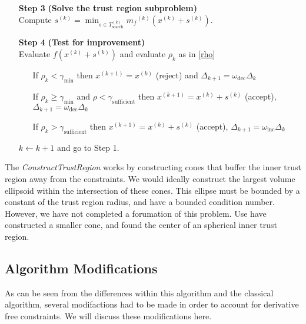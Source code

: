 \documentclass{article}
\theoremstyle{case}
\newcommand{\modelk}{{{m}_f}^{(k)}}
\newcommand{\iteratek}{{x}^{(k)}}
\newcommand{\trialk}{{{s}^{(k)}}}
\newcommand{\iteratekpone}{{x}^{(k+1)}}
\newcommand{\outertrk}{{T_{\text{out}}^{(k)}}}
\newcommand{\searchtrk}{{T_{\text{search}}^{(k)}}}
\newcommand{\feasiblek}{{F}^{(k)}}
\newcommand{\omegainc}{\omega_{\text{inc}}}
\newcommand{\omegadec}{\omega_{\text{dec}}}
\newcommand{\gammasm}{\gamma_{\text{min}}}
\newcommand{\gammabi}{\gamma_{\text{sufficient}}}
\begin{document}
\begin{algorithm}[H]
\begin{itemize}
        \item[\textbf{Step 3}] \textbf{(Solve the trust region subproblem)} \\
            Compute $\trialk = \min_{s \in \searchtrk} \modelk(\iteratek + \trialk)$.
            
        \item[\textbf{Step 4}] \textbf{(Test for improvement)} \\
            Evaluate $f(\iteratek + \trialk)$ and evaluate $\rho_k$ as in \cref{rho} \begin{itemize}
                \item[] If $\rho_k < \gammasm$ then $\iteratekpone=\iteratek$ (reject) and $\Delta_{k+1} = \omegadec\Delta_{k}$
                \item[] If $\rho_k \ge \gammasm$ and $\rho < \gammabi$ then $\iteratekpone=\iteratek+\trialk$ (accept), $\Delta_{k+1} = \omegadec\Delta_{k}$
                \item[] If $\rho_k > \gammabi$ then $\iteratekpone=\iteratek+\trialk$ (accept), $\Delta_{k+1} = \omegainc\Delta_{k}$
            \end{itemize}
            $k \gets k+1$ and go to Step 1.
    \end{itemize}
\end{algorithm}



The \emph{ConstructTrustRegion} works by constructing cones that buffer the inner trust region away from the constraints.
We would ideally construct the largest volume ellipsoid within the intersection of these cones.
This ellipse must be bounded by a constant of the trust region radius, and have a bounded condition number.
However, we have not completed a forumation of this problem.
Use have constructed a smaller cone, and found the center of an spherical inner trust region.




\subsection{Algorithm Modifications}
As can be seen from the differences within this algorithm and the classical algorithm, several modifactions had to be made in order to account for derivative free constraints.
We will discuss these modifications here.
\end{document}
